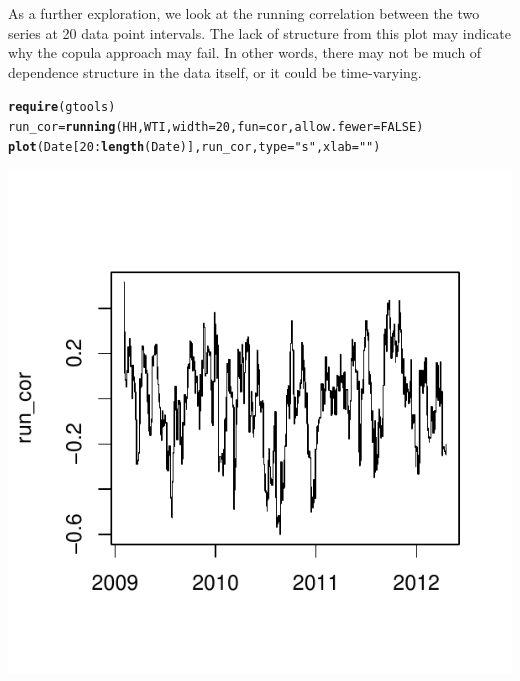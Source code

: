 \documentclass[10pt]{article}\usepackage[]{graphicx}\usepackage[]{color}
\makeatletter
\def\maxwidth{ %
  \ifdim\Gin@nat@width>\linewidth
    \linewidth
  \else
    \Gin@nat@width
  \fi
}
\newcommand{\hlnum}[1]{\textcolor[rgb]{0.686,0.059,0.569}{#1}}%
\newcommand{\hlstr}[1]{\textcolor[rgb]{0.192,0.494,0.8}{#1}}%
\newcommand{\hlopt}[1]{\textcolor[rgb]{0,0,0}{#1}}%
\newcommand{\hlstd}[1]{\textcolor[rgb]{0.345,0.345,0.345}{#1}}%
\newcommand{\hlkwb}[1]{\textcolor[rgb]{0.69,0.353,0.396}{#1}}%
\newcommand{\hlkwc}[1]{\textcolor[rgb]{0.333,0.667,0.333}{#1}}%
\newcommand{\hlkwd}[1]{\textcolor[rgb]{0.737,0.353,0.396}{\textbf{#1}}}%
\newenvironment{kframe}{%
 \def\at@end@of@kframe{}%
 \ifinner\ifhmode%
  \def\at@end@of@kframe{\end{minipage}}%
  \begin{minipage}{\columnwidth}%
 \fi\fi%
 \def\FrameCommand##1{\hskip\@totalleftmargin \hskip-\fboxsep
 \colorbox{shadecolor}{##1}\hskip-\fboxsep
     \hskip-\linewidth \hskip-\@totalleftmargin \hskip\columnwidth}%
 \MakeFramed {\advance\hsize-\width
   \@totalleftmargin\z@ \linewidth\hsize
   \@setminipage}}%
 {\par\unskip\endMakeFramed%
 \at@end@of@kframe}
\newenvironment{knitrout}{}{} %
\makeatother
\begin{document}
As a further exploration, we look at the running correlation between the two series at 20 data point intervals. The lack of structure from this plot may indicate why the copula approach may fail. In other words, there may not be much of dependence structure in the data itself, or it could be time-varying. 
\begin{knitrout}
\color{fgcolor}\begin{kframe}
\begin{alltt}
\hlkwd{require}\hlstd{(gtools)}
\hlstd{run_cor} \hlkwb{=} \hlkwd{running}\hlstd{(HH, WTI,} \hlkwc{width} \hlstd{=} \hlnum{20}\hlstd{,} \hlkwc{fun} \hlstd{= cor,} \hlkwc{allow.fewer} \hlstd{=} \hlnum{FALSE}\hlstd{)}
\hlkwd{plot}\hlstd{(Date[}\hlnum{20}\hlopt{:}\hlkwd{length}\hlstd{(Date)], run_cor,} \hlkwc{type} \hlstd{=} \hlstr{"s"}\hlstd{,} \hlkwc{xlab} \hlstd{=} \hlstr{""}\hlstd{)}
\end{alltt}
\end{kframe}

{\centering \includegraphics[width=\maxwidth]{figure/unnamed-chunk-18} 

}



\end{knitrout}
\end{document}
